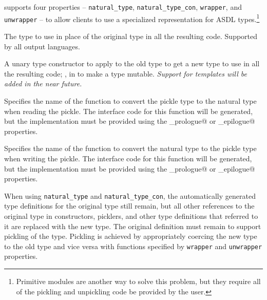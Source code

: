 \asdlgen{} supports four properties -- \lstinline!natural_type!,
\lstinline!natural_type_con!, \lstinline!wrapper!, and \lstinline!unwrapper! --
to allow clients to use a specialized representation for ASDL types.\footnote{
  Primitive modules are another way to solve this problem, but they require
  all of the pickling and unpickling code be provided by the user.
}
\begin{description}
    The type to use in place of the original type in all the resulting code.
    Supported by all output languages.

    A unary type constructor to apply to the old type to get a new type to
    use in all the resulting code; \eg{}, \lstinline@ref@ in \sml to make a type
    mutable.
    \emph{Support for \Cplusplus{} templates will be added in the near future.}

    Specifies the name of the function to convert the pickle type to the natural
    type when reading the pickle.  The interface code for this function will
    be generated, but the implementation must be provided using the
    \lstinline@implementation_prologue@ or \lstinline@implementation_epilogue@
    properties.

    Specifies the name of the function to convert the natural type to the pickle
    type when writing the pickle.  The interface code for this function will
    be generated, but the implementation must be provided using the
    \lstinline@implementation_prologue@ or \lstinline@implementation_epilogue@
    properties.
\end{description}%

When using \lstinline!natural_type! and \lstinline!natural_type_con!,
the automatically generated type definitions for the original type still
remain, but all other references to the original type in constructors, picklers,
and other type definitions that referred to it are replaced with the new type.
The original definition must remain to support pickling of the type. Pickling
is achieved by appropriately coercing the new type to the old type and vice
versa with functions specified by \lstinline!wrapper! and \lstinline!unwrapper!
properties.

